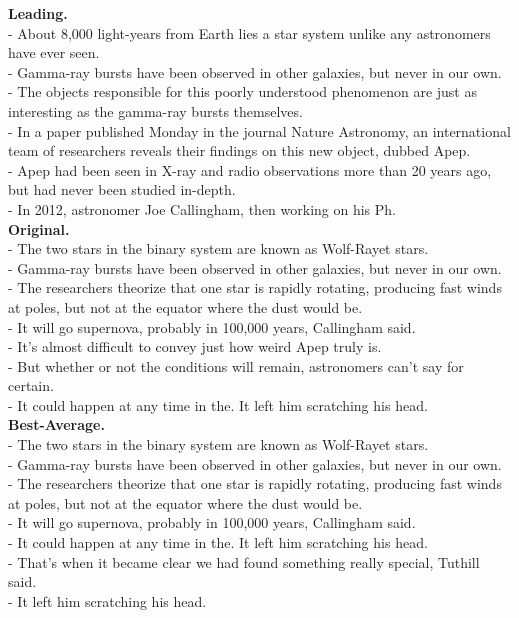 \documentclass[10pt]{article}
\begin{document}
\textbf{Leading.} \\
- About 8,000 light-years from Earth lies a star system unlike any astronomers have ever seen. \\
- {\color{orange}Gamma-ray bursts have been observed in other galaxies, but never in our own.} \\
- The objects responsible for this poorly understood phenomenon are just as interesting as the gamma-ray bursts themselves.\\
- In a paper published Monday in the journal Nature Astronomy, an international team of researchers reveals their findings on this new object, dubbed Apep.\\
- Apep had been seen in X-ray and radio observations more than 20 years ago, but had never been studied in-depth.\\
- In 2012, astronomer Joe Callingham, then working on his Ph.\\

\textbf{Original.}\\
 - {\color{blue}The two stars in the binary system are known as Wolf-Rayet stars.}\\
 - {\color{orange}Gamma-ray bursts have been observed in other galaxies, but never in our own.} \\
 - {\color{green}The researchers theorize that one star is rapidly rotating, producing fast winds at poles, but not at the equator where the dust would be.} \\
 - {\color{pink}It will go supernova, probably in 100,000 years, Callingham said.}\\
 - It's almost difficult to convey just how weird Apep truly is.\\
 - But whether or not the conditions will remain, astronomers can't say for certain.\\
 -  {\color{red}It could happen at any time in the. It left him scratching his head.}\\

\textbf{Best-Average.}\\
 - {\color{blue}The two stars in the binary system are known as Wolf-Rayet stars.}\\
 - {\color{orange}Gamma-ray bursts have been observed in other galaxies, but never in our own.}\\
 - {\color{green}The researchers theorize that one star is rapidly rotating, producing fast winds at poles, but not at the equator where the dust would be.}\\
 - {\color{pink}It will go supernova, probably in 100,000 years, Callingham said.}\\
 - {\color{red}It could happen at any time in the. It left him scratching his head.} \\
 - That's when it became clear we had found something really special, Tuthill said.\\
 -  It left him scratching his head.\\
\end{document}

